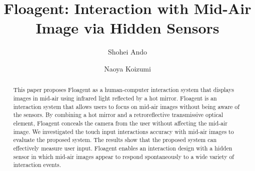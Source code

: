 \documentclass[sigconf]{acmart}
\begin{document}
\title{Floagent: Interaction with Mid-Air Image via Hidden Sensors}

\author{Shohei Ando}

\author{Naoya Koizumi}

\renewcommand{\shortauthors}{S.Ando, et al.}

\begin{abstract}
  This paper proposes Floagent as a human-computer interaction system that displays images in mid-air using infrared light reflected by a hot mirror. 
  Floagent is an interaction system that allows users to focus on mid-air images without being aware of the sensors.
  By combining a hot mirror and a retroreflective transmissive optical element, Floagent conceals the camera from the user without affecting the mid-air image.
  We investigated the touch input interactions accuracy with mid-air images to evaluate the proposed system. 
  The results show that the proposed system can effectively measure user input.
  Floagent enables an interaction design with a hidden sensor in which mid-air images appear to respond spontaneously to a wide variety of interaction events. 
\end{abstract}
\end{document}
